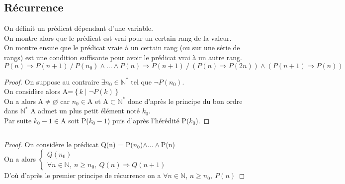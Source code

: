 \subsection{Récurrence}
On définit un prédicat dépendant d'une variable.
\\On montre alors que le prédicat est vrai pour un certain rang de la valeur.
\\On montre ensuie que le prédicat vraie à un certain rang (ou sur une série de rangs) est une condition suffisante pour avoir le prédicat vrai à un autre rang.
$$P(n)\Rightarrow P(n+1)~/~P(n_0)\wedge ...\wedge P(n)\Rightarrow P(n+1)~/~(P(n)\Rightarrow P(2n))\wedge (P(n+1)\Rightarrow P(n))$$
\begin{proof}
On suppose au contraire $\exists n_0\in\mathbb{N} ^*$ tel que $\neg P(n_0)$.
\\On considère alors A=$\left\{ 
k \mid \neg P(k)
\right\}$ 
\\On a alors A$\neq\varnothing$ car $n_0\in$A et A$\subset\mathbb{N} ^*$ donc d'après le principe du bon ordre dans $\mathbb{N} ^*$ A admet un plus petit élément noté $k_0$. 
\\Par suite $k_0-1\in$A soit P($k_0-1$) puis d'après l'hérédité P($k_0$).
\end{proof} ${}$\\
\begin{proof}
On considère le prédicat Q(n) = P($n_0$)$\wedge ...\wedge$P(n)
\\ On a alors
$\left\{
\begin{array}{l}
Q(n_0)\\
\forall n\in\mathbb{N} ,~n\geq n_0,~Q(n)\Rightarrow Q(n+1)
\end{array}
\right.$
\\ D'où d'après le premier principe de récurrence on a $\forall n\in\mathbb{N}$, $n\geq n_0, ~ P(n)$
\end{proof}


